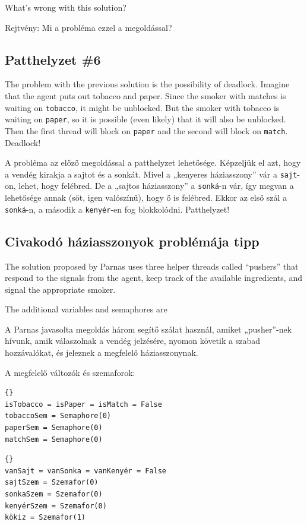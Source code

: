 \documentclass{book}
\newcommand{\clearemptydoublepage}{\newpage\cleardoublepage}
\begin{document}
What's wrong with this solution?

Rejtvény: Mi a probléma ezzel a megoldással?

\clearemptydoublepage
\subsection{Patthelyzet \#6}

The problem with the previous solution is the possibility
of deadlock.  Imagine that the agent puts out tobacco and
paper.  Since the smoker with matches is waiting on {\tt tobacco},
it might be unblocked.  But the smoker with tobacco is
waiting on {\tt paper}, so it is possible (even likely) that
it will also be unblocked.  Then the first thread will block
on {\tt paper} and the second will block on {\tt match}.
Deadlock!

A probléma az előző megoldással a patthelyzet lehetősége.
Képzeljük el azt, hogy a vendég kirakja a sajtot és a sonkát.
Mivel a „kenyeres háziasszony” vár a {\tt sajt}-on, lehet, hogy felébred.
De a „sajtos háziasszony” a {\tt sonká}-n vár, így megvan a lehetősége annak
(sőt, igen valószínű), hogy ő is felébred. Ekkor az első szál a {\tt sonká}-n,
a második a {\tt kenyér}-en fog blokkolódni. Patthelyzet!

\clearemptydoublepage
\subsection{Civakodó háziasszonyok problémája tipp}

The solution proposed by Parnas uses three helper threads
called ``pushers'' that respond to the signals from the agent,
keep track of the available ingredients, and signal the
appropriate smoker.

The additional variables and semaphores are

A Parnas javasolta megoldás három segítő szálat használ, amiket
„pusher”-nek hívunk, amik válaszolnak a vendég jelzésére, nyomon követik
a szabad hozzávalókat, és jeleznek a megfelelő háziasszonynak.

A megfelelő változók és szemaforok:

\begin{lstlisting}[title={Smokers problem hint}]{}
isTobacco = isPaper = isMatch = False
tobaccoSem = Semaphore(0)
paperSem = Semaphore(0)
matchSem = Semaphore(0)
\end{lstlisting}

\begin{lstlisting}[title={Civakodó háziasszonyok tipp}]{}
vanSajt = vanSonka = vanKenyér = False
sajtSzem = Szemafor(0)
sonkaSzem = Szemafor(0)
kenyérSzem = Szemafor(0)
kökiz = Szemafor(1)
\end{lstlisting}
\end{document}
